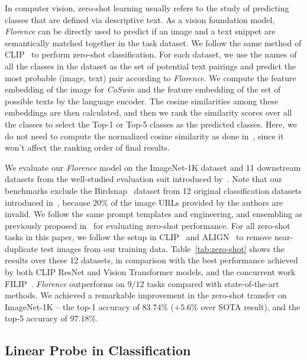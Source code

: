 \documentclass{article}
\begin{document}
In computer vision, zero-shot learning usually refers to the study of predicting classes that are
defined via descriptive text. As a vision foundation model, \emph{Florence} can be directly used to
predict if an image and a text snippet are semantically matched together in the task dataset. We
follow the same method of CLIP~\cite{radford2021learning} to perform zero-shot classification. For each
dataset, we use the names of all the classes in the dataset as the set of potential text pairings
and predict the most probable (image, text) pair according to \emph{Florence}. We compute the
feature embedding of the image for \emph{CoSwin} and the feature embedding of the set of possible
texts by the language encoder. The cosine similarities among these embeddings are then calculated,
and then we rank the similarity scores over all the classes to select the Top-1 or Top-5 classes as
the predicted classes. Here, we do not need to compute the normalized cosine similarity as done
in~\cite{radford2021learning}, since it won't affect the ranking order of final results.

We evaluate our \emph{Florence} model on the ImageNet-1K dataset and 11 downstream datasets from the
well-studied evaluation suit introduced by~\cite{kornblith2019better}. Note that our benchmarks
exclude the Birdsnap~\cite{6909656} dataset from 12 original classification datasets introduced
in~\cite{kornblith2019better}, because $20\%$ of the image URLs provided by the authors
are invalid. We follow the same prompt templates and engineering, and ensembling
as previously proposed in~\cite{radford2021learning} for evaluating zero-shot performance. For all zero-shot tasks in this
paper, we follow the setup in CLIP~\cite{radford2021learning} and ALIGN~\cite{jia2021scaling} to
remove near-duplicate test images from our training data. Table~\ref{tab:zero-shot} shows the
results over these 12 datasets, in comparison with the best performance achieved by both CLIP ResNet
and Vision Transformer models, and the concurrent work FILIP~\cite{yao2021filip}. \emph{Florence} outperforms on $9/12$ tasks compared with state-of-the-art methods. We achieved a remarkable improvement in the zero-shot transfer on ImageNet-1K -- the top-1 accuracy of $83.74\%$ ($+5.6\%$ over SOTA result),  and the top-5 accuracy of
$97.18\%$.

\subsection{Linear Probe in Classification}
\end{document}
